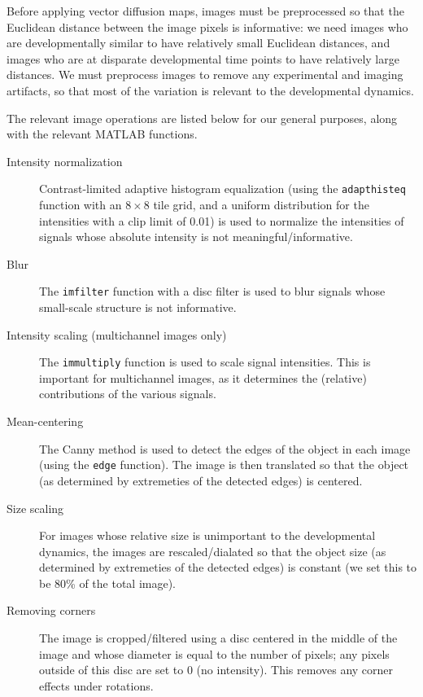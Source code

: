 Before applying vector diffusion maps, images must be preprocessed so that the Euclidean distance between the image pixels is informative: we need images who are developmentally similar to have relatively small Euclidean distances, and images who are at disparate developmental time points to have relatively large distances. 
%
We must preprocess images to remove any experimental and imaging artifacts, so that most of the variation is relevant to the developmental dynamics. 

The relevant image operations are listed below for our general purposes, along with the relevant MATLAB functions. 
\begin{description}

\item[Intensity normalization] Contrast-limited adaptive histogram equalization (using the \texttt{adapthisteq} function with an $8 \times 8$ tile grid, and a uniform distribution for the intensities with a clip limit of 0.01) is used to normalize the intensities of signals whose absolute intensity is not meaningful/informative.
%
\item[Blur] The \texttt{imfilter} function with a disc filter is used to blur signals whose small-scale structure is not informative. 
%
\item[Intensity scaling (multichannel images only)] The \texttt{immultiply} function is used to scale signal intensities. This is important for multichannel images, as it determines the (relative) contributions of the various signals.  
%
\item[Mean-centering]  The Canny method \citep{canny1986computational} is used to detect the edges of the object in each image (using the \texttt{edge} function). The image is then translated so that the object (as determined by extremeties of the detected edges) is centered.
%
\item[Size scaling] For images whose relative size is unimportant to the developmental dynamics, the images are rescaled/dialated so that the object size (as determined by extremeties of the detected edges) is constant (we set this to be 80\% of the total image).
%
\item[Removing corners] The image is cropped/filtered using a disc centered in the middle of the image and whose diameter is equal to the number of pixels; any pixels outside of this disc are set to 0 (no intensity). This removes any corner effects under rotations. 
\end{description}



